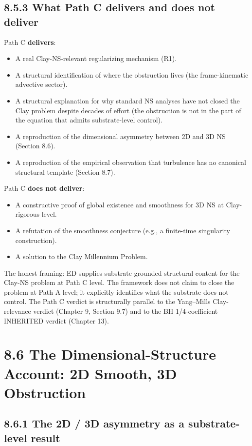 \documentclass[11pt]{book}
\begin{document}
\subsection{8.5.3 What Path C delivers and does not deliver}

Path C \textbf{delivers}:

\begin{itemize}
\item A real Clay-NS-relevant regularizing mechanism (R1).
\item A structural identification of where the obstruction lives (the frame-kinematic advective sector).
\item A structural explanation for why standard NS analyses have not closed the Clay problem despite decades of effort (the obstruction is not in the part of the equation that admits substrate-level control).
\item A reproduction of the dimensional asymmetry between 2D and 3D NS (Section 8.6).
\item A reproduction of the empirical observation that turbulence has no canonical structural template (Section 8.7).
\end{itemize}

Path C \textbf{does not deliver}:

\begin{itemize}
\item A constructive proof of global existence and smoothness for 3D NS at Clay-rigorous level.
\item A refutation of the smoothness conjecture (e.g., a finite-time singularity construction).
\item A solution to the Clay Millennium Problem.
\end{itemize}

The honest framing: ED supplies substrate-grounded structural content for the Clay-NS problem at Path C level. The framework does not claim to close the problem at Path A level; it explicitly identifies what the substrate does not control. The Path C verdict is structurally parallel to the Yang–Mills Clay-relevance verdict (Chapter 9, Section 9.7) and to the BH 1/4-coefficient INHERITED verdict (Chapter 13).

\section{8.6 The Dimensional-Structure Account: 2D Smooth, 3D Obstruction}

\subsection{8.6.1 The 2D / 3D asymmetry as a substrate-level result}
\end{document}

